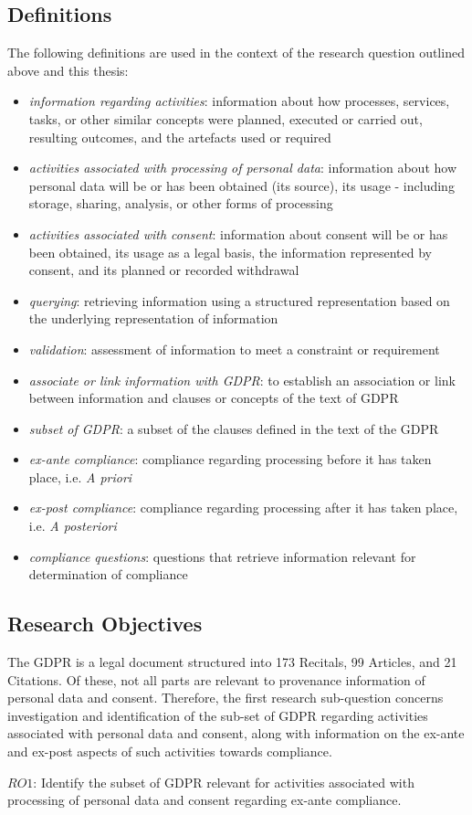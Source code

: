\subsection{Definitions}\label{sec:intro:definitions}
The following definitions are used in the context of the research question outlined above and this thesis:
\begin{itemize}
    \item \textit{information regarding activities}: information about how processes, services, tasks, or other similar concepts were planned, executed or carried out, resulting outcomes, and the artefacts used or required
    \item \textit{activities associated with processing of personal data}: information about how personal data will be or has been obtained (its source), its usage - including storage, sharing, analysis, or other forms of processing 
    \item \textit{activities associated with consent}: information about consent will be or has been obtained, its usage as a legal basis, the information represented by consent, and its planned or recorded withdrawal
    \item \textit{querying}: retrieving information using a structured representation based on the underlying representation of information
    \item \textit{validation}: assessment of information to meet a constraint or requirement
    \item \textit{associate or link information with GDPR}: to establish an association or link between information and clauses or concepts of the text of GDPR
    \item \textit{subset of GDPR}: a subset of the clauses defined in the text of the GDPR
    \item \textit{ex-ante compliance}: compliance regarding processing before it has taken place, i.e. \textit{A priori}
    \item \textit{ex-post compliance}: compliance regarding processing after it has taken place, i.e. \textit{A posteriori}
    \item \textit{compliance questions}: questions that retrieve information relevant for determination of compliance
\end{itemize}

\subsection{Research Objectives}\label{sec:intro:RO}
The GDPR is a legal document structured into 173 Recitals, 99 Articles, and 21 Citations. Of these, not all parts are relevant to provenance information of personal data and consent. Therefore, the first research sub-question concerns investigation and identification of the sub-set of GDPR regarding activities associated with personal data and consent, along with information on the ex-ante and ex-post aspects of such activities towards compliance.
\begin{framed}
$RO1$: Identify the subset of GDPR relevant for activities associated with processing of personal data and consent regarding ex-ante compliance.
\end{framed}

